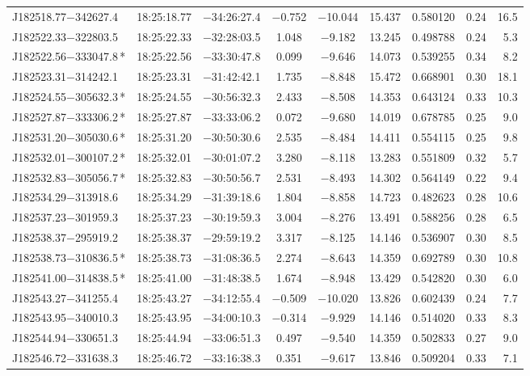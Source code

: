 \begin{table*}
\begin{tabular}{lcccccccr}
J182518.77$-$342627.4 & 18:25:18.77 & $-$34:26:27.4 & $-$0.752 & $-$10.044 & 15.437 & 0.580120 & 0.24 & 16.5 \\
J182522.33$-$322803.5 & 18:25:22.33 & $-$32:28:03.5 &  1.048 & $-$9.182 & 13.245 & 0.498788 & 0.24 & 5.3 \\
J182522.56$-$333047.8\,* & 18:25:22.56 & $-$33:30:47.8 &  0.099 & $-$9.646 & 14.073 & 0.539255 & 0.34 & 8.2 \\
J182523.31$-$314242.1 & 18:25:23.31 & $-$31:42:42.1 &  1.735 & $-$8.848 & 15.472 & 0.668901 & 0.30 & 18.1 \\
J182524.55$-$305632.3\,* & 18:25:24.55 & $-$30:56:32.3 &  2.433 & $-$8.508 & 14.353 & 0.643124 & 0.33 & 10.3 \\
J182527.87$-$333306.2\,* & 18:25:27.87 & $-$33:33:06.2 &  0.072 & $-$9.680 & 14.019 & 0.678785 & 0.25 & 9.0 \\
J182531.20$-$305030.6\,* & 18:25:31.20 & $-$30:50:30.6 &  2.535 & $-$8.484 & 14.411 & 0.554115 & 0.25 & 9.8 \\
J182532.01$-$300107.2\,* & 18:25:32.01 & $-$30:01:07.2 &  3.280 & $-$8.118 & 13.283 & 0.551809 & 0.32 & 5.7 \\
J182532.83$-$305056.7\,* & 18:25:32.83 & $-$30:50:56.7 &  2.531 & $-$8.493 & 14.302 & 0.564149 & 0.22 & 9.4 \\
J182534.29$-$313918.6 & 18:25:34.29 & $-$31:39:18.6 &  1.804 & $-$8.858 & 14.723 & 0.482623 & 0.28 & 10.6 \\
J182537.23$-$301959.3 & 18:25:37.23 & $-$30:19:59.3 &  3.004 & $-$8.276 & 13.491 & 0.588256 & 0.28 & 6.5 \\
J182538.37$-$295919.2 & 18:25:38.37 & $-$29:59:19.2 &  3.317 & $-$8.125 & 14.146 & 0.536907 & 0.30 & 8.5 \\
J182538.73$-$310836.5\,* & 18:25:38.73 & $-$31:08:36.5 &  2.274 & $-$8.643 & 14.359 & 0.692789 & 0.30 & 10.8 \\
J182541.00$-$314838.5\,* & 18:25:41.00 & $-$31:48:38.5 &  1.674 & $-$8.948 & 13.429 & 0.542820 & 0.30 & 6.0 \\
J182543.27$-$341255.4 & 18:25:43.27 & $-$34:12:55.4 & $-$0.509 & $-$10.020 & 13.826 & 0.602439 & 0.24 & 7.7 \\
J182543.95$-$340010.3 & 18:25:43.95 & $-$34:00:10.3 & $-$0.314 & $-$9.929 & 14.146 & 0.514020 & 0.33 & 8.3 \\
J182544.94$-$330651.3 & 18:25:44.94 & $-$33:06:51.3 &  0.497 & $-$9.540 & 14.359 & 0.502833 & 0.27 & 9.0 \\
J182546.72$-$331638.3 & 18:25:46.72 & $-$33:16:38.3 &  0.351 & $-$9.617 & 13.846 & 0.509204 & 0.33 & 7.1 \\

\end{tabular}
\end{table*}
